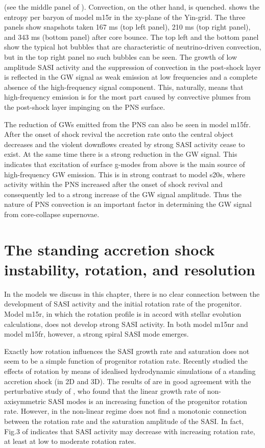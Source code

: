 (see the middle panel of ). Convection, on the other hand, is quenched. 
 shows the entropy per baryon of model m15r in the xy-plane of the Yin-grid.
The three panels show snapshots taken 167 ms (top left panel), 210 ms (top right panel), and 343 ms (bottom panel)
after core bounce. The top left and the bottom panel show the typical hot bubbles that are characteristic of
neutrino-driven convection, but in the top right panel no such bubbles can be seen. 
The growth of low amplitude SASI activity and the suppression of convection in the post-shock layer is reflected
in the GW signal as weak emission at low frequencies and a complete absence of the high-frequency signal component.
This, naturally, means that high-frequency emission is for the most part caused by convective plumes from
the post-shock layer impinging on the PNS surface.

The reduction of GWs emitted from the PNS can also be seen in model m15fr. After the onset of shock revival
the accretion rate onto the central object decreases and the violent downflows created by strong SASI activity cease to exist. At the same time there is a strong reduction in the GW signal. This indicates
that excitation of surface g-modes from above is the main source of high-frequency GW emission.
This is in strong contrast to model s20s, where activity within the PNS increased after
the onset of shock revival and consequently led to a strong increase of the GW signal amplitude.
Thus the nature of PNS convection is an important factor in determining the 
GW signal from core-collapse supernovae.

\section{The standing accretion shock instability, rotation, and resolution}
In the models we discuss in this chapter, there is no clear connection between the development of SASI activity and the initial rotation rate of
the progenitor. Model m15r, in which the rotation profile is in accord with stellar
evolution calculations, does not develop strong SASI activity. In both model m15nr and model m15fr, however, a strong spiral SASI mode emerges. 

Exactly how rotation influences the SASI growth rate and saturation does not seem to be a simple function of progenitor rotation rate. Recently \cite{blondin_17} studied the effects of rotation by means of idealised hydrodynamic simulations of a standing accretion shock (in 2D and 3D). 
The results of \cite{blondin_17} are in good agreement with the perturbative study of \cite{yamasaki_08}, 
who found that the linear growth rate 
of non-axisymmetric SASI modes is an increasing function of the progenitor rotation rate.
However, in the non-linear regime \cite{kazeroni_17} does not find a monotonic connection between the
rotation rate and the saturation amplitude of the SASI. In fact, Fig.3 of \cite{kazeroni_17} indicates that
SASI activity may decrease with increasing rotation rate, at least at low to moderate rotation rates. 

